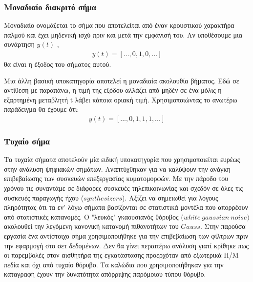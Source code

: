 \documentclass[breaklines=true, 12pt]{article}
\newcommand{\en}[1]{\foreignlanguage{english}{#1}}
\begin{document}
\subsubsection{Μοναδιαίο διακριτό σήμα}
\label{sec:orgd595c5b}
Μοναδιαίο ονομάζεται το σήμα που αποτελείται από έναν κρουστικού
χαρακτήρα παλμού και έχει μηδενική ισχύ πριν και μετά την εμφάνισή
του. Αν υποθέσουμε μια συνάρτηση \(y(t)\) ,
\begin{equation}
\begin{align}
y(t) = [..., 0, 1, 0, ...]
\end{align}
\end{equation}
θα είναι η έξοδος του σήματος αυτού.

Μια άλλη βασική υποκατηγορία αποτελεί η μοναδιαία ακολουθία βήματος.
Εδώ σε αντίθεση με παραπάνω, η τιμή της εξόδου αλλάζει από μηδέν σε ένα
μόλις η εξαρτημένη μεταβλητή \en{t} λάβει κάποια οριακή τιμή.
Χρησιμοποιώντας το ανωτέρω παράδειγμα θα έχουμε ότι:
\begin{equation}
\begin{align}
y(t) = [..., 0, 1, 1, 1, ...]
\end{align}
\end{equation}
\subsubsection{Τυχαίο σήμα}
\label{sec:orgba77cc1}
Τα τυχαία σήματα αποτελούν μία ειδική υποκατηγορία που χρησιμοποιείται
ευρέως στην ανάλυση ψηφιακών σημάτων. Αναπτύχθηκαν για να καλύψουν την
ανάγκη επιβεβαίωσης των συσκευών επεξεργασίας κυματομορφών. Με την
πάροδο του χρόνου τις συναντάμε σε διάφορες συσκευές τηλεπικοινωνίας
και σχεδόν σε όλες τις συσκευές παραγωγής ήχου (\(synthesizers\)).
Αξίζει να σημειωθεί για λόγους πληρότητας ότι τα εν' λόγω σήματα
βασίζονται σε στατιστικά μοντέλα που απορρέουν από στατιστικές κατανομές.
Ο "λευκός" γκαουσιανός θόρυβος (\(white\ gaussian\ noise)\) ακολουθεί
την λεγόμενη κανονική κατανομή πιθανοτήτων του \(Gauss\). Στην παρούσα
εργασία ένα αντίστοιχο σήμα χρησιμοποιήθηκε για την επιβεβαίωση των
φίλτρων πριν την εφαρμογή στο σετ δεδομένων. Δεν θα γίνει περαιτέρω
ανάλυση γιατί κρίθηκε πως οι παρεμβολές στον αισθητήρα της εγκατάστασης
προερχόταν από εξωτερικά Η/Μ πεδία και όχι από τυχαίο θόρυβο. Τα καλώδια
που χρησιμοποιήθηκαν για την καταγραφή έχουν την δυνατότητα απόρριψης
παρόμοιου τύπου θόρυβο.
\end{document}
